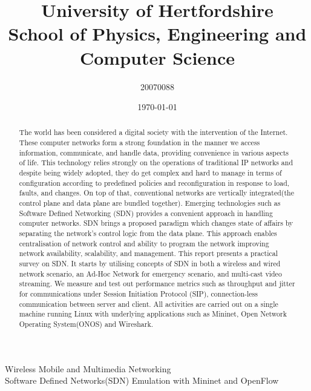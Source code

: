 \documentclass{article}
\title{University of Hertfordshire\\School of Physics, Engineering and Computer Science}
\author{20070088}
\date{\today}
\begin{document}
\maketitle
\begin{center}
    \large{Wireless Mobile and Multimedia Networking} \\[100pt]
    \huge{Software Defined Networks(SDN) Emulation with Mininet and OpenFlow }
\end{center}

\newpage
\tableofcontents
\newpage
\listoftables
\listoffigures

\newpage
\begin{abstract}
The world has been considered a digital society with the intervention of the Internet. These computer networks form a strong foundation in the manner we access information, communicate, and handle data, providing convenience in various aspects of life. This technology relies strongly on the operations of traditional IP networks and despite being widely adopted, they do get complex and hard to manage in terms of configuration according to predefined policies and reconfiguration in response to load, faults, and changes. On top of that, conventional networks are vertically integrated(the control plane and data plane are bundled together). Emerging technologies such as Software Defined Networking (SDN) provides a convenient approach in handling computer networks. SDN brings a proposed paradigm which changes state of affairs by separating the network's control logic from the data plane. This approach enables centralisation of network control and ability to program the network improving network availability, scalability, and management. This report presents a practical survey on SDN. It starts by utilising concepts of SDN in both a wireless and wired network scenario, an Ad-Hoc Network for emergency scenario, and multi-cast video streaming. We measure and test out performance metrics such as throughput and jitter for communications under Session Initiation Protocol (SIP), connection-less communication between server and client. All activities are carried out on a single machine running Linux with underlying applications such as Mininet, Open Network Operating System(ONOS) and Wireshark.
\end{abstract}


\newpage
\end{document}
